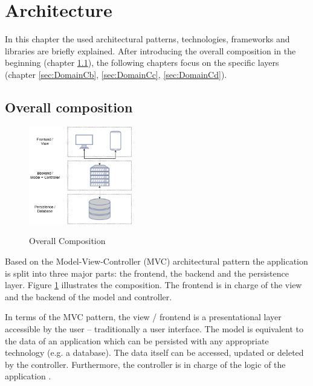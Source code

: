 
\section{Architecture}
\label{sec:DomainC}

In this chapter the used architectural patterns, technologies, frameworks and libraries are briefly explained. After introducing the overall composition in the beginning (chapter \ref{sec:DomainCa}), the following chapters focus on the specific layers (chapter \ref{sec:DomainCb}, \ref{sec:DomainCc}, \ref{sec:DomainCd}).


\subsection{Overall composition}
\label{sec:DomainCa}

\begin{figure}
	\centering
	\includegraphics[width=0.4\textwidth]{Content/Domain/OverallComposition.png}
	\caption{Overall Composition}
	\cite{own representation}
	\label{fig:overallcomposition}
\end{figure}

Based on the Model-View-Controller (\ac{MVC}) architectural pattern the application is split into three major parts: the frontend, the backend and the persistence layer. Figure \ref{fig:overallcomposition} illustrates the composition. The frontend is in charge of the view and the backend of the model and controller.

In terms of the \ac{MVC} pattern, the view / frontend is a presentational layer accessible by the user – traditionally a user interface. The model is equivalent to the data of an application which can be persisted with any appropriate technology (e.g. a database). The data itself can be accessed, updated or deleted by the controller. Furthermore, the controller is in charge of the logic of the application \cite[p. 7]{steyerWebanwendungenMitASP2017}.



